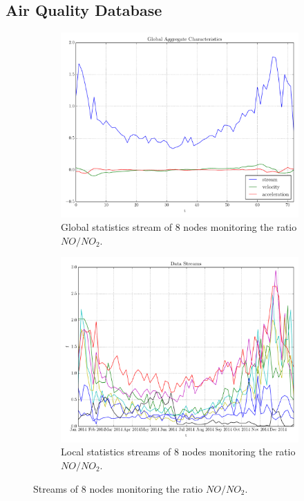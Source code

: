 \subsection{Air Quality Database}
\begin{figure}[!h]
\centering
\begin{subfigure}[t]{0.49\textwidth}
\centering
\includegraphics[scale=0.34, trim=2cm 0 0 0]{img/AT_NO2_NO_2014_8N_global.pdf}
\caption{Global statistics stream of 8 nodes monitoring the ratio $NO/NO_2$.}
\end{subfigure}
\begin{subfigure}[t]{0.49\textwidth}
\centering
\includegraphics[scale=0.34]{img/AT_NO2_NO_2014_8N_streams.pdf}
\caption{Local statistics streams of 8 nodes monitoring the ratio $NO/NO_2$.} 
\end{subfigure}
\vspace{0.5cm}
\caption{Streams of 8 nodes monitoring the ratio $NO/NO_2$.}\label{fig:NO2_NO}
\end{figure}
